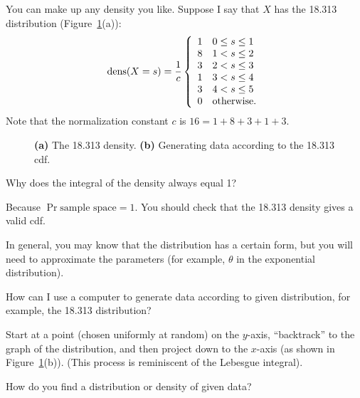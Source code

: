 \medskip


\medskip

You can make up any density you like.  Suppose I say
that $X$ has the 18.313
distribution (Figure~\ref{fig:18.313}(a)): 
\[
  \mbox{dens}(X=s) = \frac{1}{c}
	 \left\{ 
	   \begin{array}{ll}
		1 & 0\leq s\leq 1  \\
		8 & 1 < s \leq 2  \\
		3 & 2 < s \leq 3  \\
		1 & 3 < s \leq 4 \\
		3 & 4 < s \leq 5 \\
		0 & \mbox{otherwise.}
	   \end{array}
	 \right. 
\]
Note that the normalization constant $c$ is $16=1+8+3+1+3$.

\begin{figure}
\begin{center}
\mbox{}
\end{center}
\caption{{\bf (a)} The 18.313 density. 
         {\bf (b)} Generating data according to the 18.313 cdf.}
\label{fig:18.313}
\end{figure}

\medskip

 Why does the integral of the density always
equal 1? 

 Because $\Pr{\mbox{sample space}} = 1$.  You
should check that the 18.313 density gives a valid cdf. 
\QED

\medskip

In general, you may know that the distribution has a certain form, but
you will need to approximate the parameters (for example, $\theta$ in
the exponential distribution).

\medskip

How can I use a computer to generate data according to given
distribution, for example, the 18.313
distribution?

Start at a point (chosen uniformly at random) on the $y$-axis,
``backtrack'' 
to the graph of the distribution, and then project down to the $x$-axis
(as shown in Figure~\ref{fig:18.313}(b)).
(This process is reminiscent of the Lebesgue integral).

\medskip

How do you find a distribution or density of given data?

